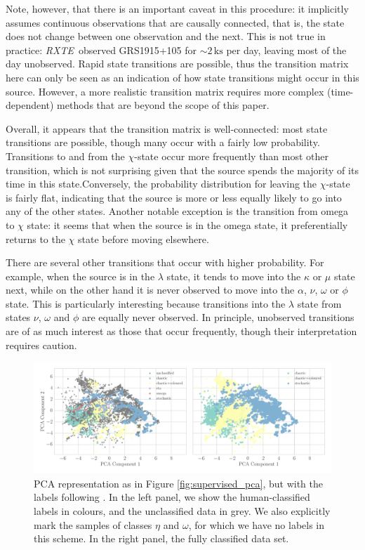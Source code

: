 \documentclass[12pt]{emulateapj}
\newcommand{\project}[1]{\textsl{#1}}
\newcommand{\rxte}{\project{RXTE}}
\begin{document}
Note, however, that there is an important caveat in this procedure: it implicitly assumes continuous observations that are causally connected, that is, the state 
does not change between one observation and the next. This is not true in practice: \rxte\ observed GRS1915+105 for $\sim 2\,\mathrm{ks}$ per day, leaving most 
of the day unobserved. Rapid state transitions are possible, thus the transition matrix here can only be seen as an indication of how state transitions might occur 
in this source. However, a more realistic transition matrix requires more complex (time-dependent) methods that are beyond the scope of this paper.

Overall, it appears that the transition matrix is well-connected: most state transitions are possible, though many occur with a fairly low probability.
Transitions to and from the $\chi$-state occur more frequently than most other transition, which is not surprising given that the source spends the majority of its time 
in this state.Conversely, the probability distribution for leaving the $\chi$-state is fairly flat, indicating that the source is more or less equally likely to go into any 
of the other states. Another notable exception is the transition from omega to $\chi$ state: it seems that when the source is in the omega state, it preferentially 
returns to the $\chi$ state before moving elsewhere. 

There are several other transitions that occur with higher probability. For example, when the source is in 
the $\lambda$ state, it tends to move into the $\kappa$ or $\mu$ state next, while on the other hand it is never observed to move into the $\alpha$, $\nu$, 
$\omega$ or $\phi$ state. This is particularly interesting because transitions into the $\lambda$ state from states $\nu$, $\omega$ and $\phi$ are equally 
never observed. In principle, unobserved transitions are of as much interest as those that occur frequently, though their interpretation requires caution. 

\begin{figure}[htbp]
\begin{center}
\includegraphics[width=\textwidth]{grs1915_supervised_phys_features_pca.pdf}
\caption{PCA representation as in Figure \ref{fig:supervised_pca}, but with the labels following \citet{harikrishnan2011}. In the left panel, we show the human-classified labels in colours, and the unclassified data in grey. We also explicitly mark the samples of classes $\eta$ and $\omega$, for which we have no labels in this scheme. In the right panel, the fully classified data set.} 
\label{fig:pca_physical}
\end{center}
\end{figure}
\end{document}
